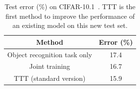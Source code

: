 \begin{table}
\begin{center}{
\begin{tabular}{c|c}  \toprule
Method 									& Error (\%) \\	\midrule
{\small Object recognition task only} 								
& 17.4\\  \midrule
{\small Joint training {\scriptsize \citep{hendrycks2019using}}}						
& 16.7\\  \midrule
TTT	(standard version)		& 15.9\\  \bottomrule
\end{tabular}
\caption{Test error (\%) on CIFAR-10.1~\cite{recht2018cifar}. TTT is the first method to improve the performance of an existing model on this new test set.}
\label{cifar10_new_table}
}\end{center}
\vspace{-3ex}
\end{table}
